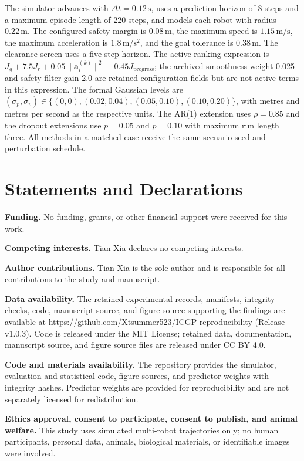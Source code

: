 \documentclass[pdflatex,sn-mathphys-num]{sn-jnl}
\begin{document}
The simulator advances with $\Delta t=0.12\,\mathrm{s}$, uses a prediction
horizon of 8 steps and a maximum episode length of 220 steps, and models each
robot with radius $0.22\,\mathrm{m}$. The configured safety margin is
$0.08\,\mathrm{m}$, the maximum speed is $1.15\,\mathrm{m/s}$, the maximum
acceleration is $1.8\,\mathrm{m/s^2}$, and the goal tolerance is
$0.38\,\mathrm{m}$. The clearance screen uses a five-step horizon. The active
ranking expression is $J_g+7.5J_r+0.05\lVert\mathbf{a}_i^{(k)}\rVert^2
-0.45J_{\mathrm{progress}}$; the archived smoothness weight 0.025 and
safety-filter gain 2.0 are retained configuration fields but are not active
terms in this expression. The formal Gaussian levels are
$(\sigma_p,\sigma_v)\in\{(0,0),(0.02,0.04),(0.05,0.10),(0.10,0.20)\}$,
with metres and metres per second as the respective units. The AR(1) extension
uses $\rho=0.85$ and the dropout extensions use $p=0.05$ and $p=0.10$ with
maximum run length three. All methods in a matched case receive the same
scenario seed and perturbation schedule.

\providecommand{\burl}[1]{}
\providecommand{\arxivurl}[1]{}


\normalsize
\section*{Statements and Declarations}

\textbf{Funding.} No funding, grants, or other financial support were received for this work.

\textbf{Competing interests.} Tian Xia declares no competing interests.

\textbf{Author contributions.} Tian Xia is the sole author and is responsible for all contributions to the study and manuscript.

\textbf{Data availability.} The retained experimental records, manifests, integrity checks, code, manuscript source, and figure source supporting the findings are available at \url{https://github.com/Xtsummer523/ICGP-reproducibility} (Release v1.0.3). Code is released under the MIT License; retained data, documentation, manuscript source, and figure source files are released under CC BY 4.0.

\textbf{Code and materials availability.} The repository provides the simulator, evaluation and statistical code, figure sources, and predictor weights with integrity hashes. Predictor weights are provided for reproducibility and are not separately licensed for redistribution.

\textbf{Ethics approval, consent to participate, consent to publish, and animal welfare.} This study uses simulated multi-robot trajectories only; no human participants, personal data, animals, biological materials, or identifiable images were involved.
\end{document}
